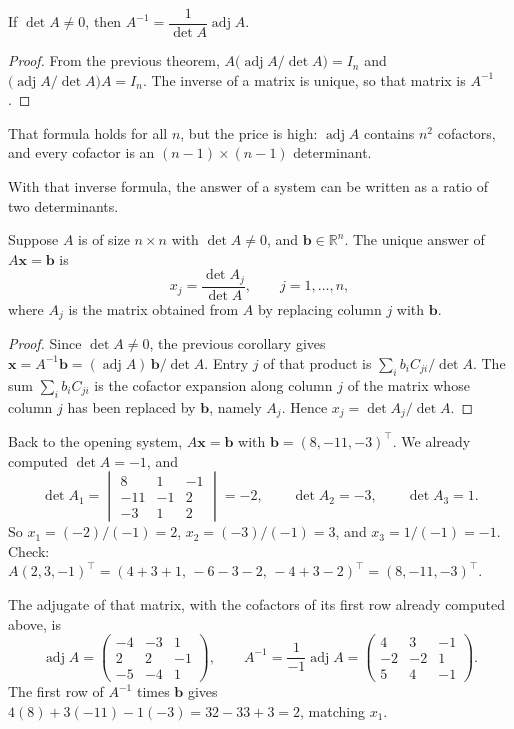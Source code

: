 \begin{akibat}
If $\det A\neq0$, then $A^{-1}=\dfrac{1}{\det A}\operatorname{adj}A$.
\end{akibat}

\begin{proof}
From the previous theorem, $A\bigl(\operatorname{adj}A/\det A\bigr)=I_{n}$ and
$\bigl(\operatorname{adj}A/\det A\bigr)A=I_{n}$. The inverse of a matrix is unique, so that
matrix is $A^{-1}$.
\end{proof}

That formula holds for all $n$, but the price is high: $\operatorname{adj}A$ contains $n^{2}$
cofactors, and every cofactor is an $(n-1)\times(n-1)$ determinant.

With that inverse formula, the answer of a system can be written as a ratio of two determinants.

\begin{teorema}
Suppose $A$ is of size $n\times n$ with $\det A\neq0$, and $\mathbf{b}\in\mathbb{R}^{n}$. The
unique answer of $A\mathbf{x}=\mathbf{b}$ is
\[
  x_{j}=\frac{\det A_{j}}{\det A},\qquad j=1,\dots,n,
\]
where $A_{j}$ is the matrix obtained from $A$ by replacing column $j$ with $\mathbf{b}$.
\end{teorema}

\begin{proof}
Since $\det A\neq0$, the previous corollary gives
$\mathbf{x}=A^{-1}\mathbf{b}=(\operatorname{adj}A)\,\mathbf{b}/\det A$. Entry $j$ of that product
is $\sum_{i}b_{i}C_{ji}/\det A$. The sum $\sum_{i}b_{i}C_{ji}$ is the cofactor expansion along
column $j$ of the matrix whose column $j$ has been replaced by $\mathbf{b}$, namely $A_{j}$.
Hence $x_{j}=\det A_{j}/\det A$.
\end{proof}

\begin{contoh}
Back to the opening system, $A\mathbf{x}=\mathbf{b}$ with $\mathbf{b}=(8,-11,-3)^{\top}$. We
already computed $\det A=-1$, and
\[
  \det A_{1}=\begin{vmatrix}8&1&-1\\ -11&-1&2\\ -3&1&2\end{vmatrix}=-2,\qquad
  \det A_{2}=-3,\qquad \det A_{3}=1 .
\]
So $x_{1}=(-2)/(-1)=2$, $x_{2}=(-3)/(-1)=3$, and $x_{3}=1/(-1)=-1$. Check:
$A(2,3,-1)^{\top}=(4+3+1,\,-6-3-2,\,-4+3-2)^{\top}=(8,-11,-3)^{\top}$.

The adjugate of that matrix, with the cofactors of its first row already computed above, is
\[
  \operatorname{adj}A=\begin{pmatrix}-4&-3&1\\ 2&2&-1\\ -5&-4&1\end{pmatrix},
  \qquad
  A^{-1}=\frac{1}{-1}\operatorname{adj}A
  =\begin{pmatrix}4&3&-1\\ -2&-2&1\\ 5&4&-1\end{pmatrix}.
\]
The first row of $A^{-1}$ times $\mathbf{b}$ gives $4(8)+3(-11)-1(-3)=32-33+3=2$, matching
$x_{1}$.
\end{contoh}

